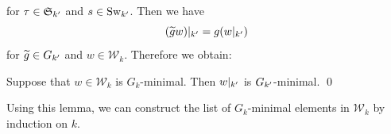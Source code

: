 \documentclass{amsart} %
\newcommand{\Sw}{\mathrm{Sw}}
\newcommand{\Wk}{\mathcal{W}_k}
\begin{document}
for $\tau\in \mathord{\mathfrak{S}}_{k^{\prime}}$ and $s \in\Sw_{k\sprime}$.
Then we have
\[
(\widetilde{g} w)|_{k^{\prime}}=g(w|_{k^{\prime}})
\]
for $\widetilde{g}\in G_{k^{\prime}}$ and $w\in \Wk$.
Therefore we obtain:
%
\begin{lemma}
Suppose that $w \in \Wk$ is $G_k$-minimal.
Then $w|_{k^{\prime}}$ is $G_{k^{\prime}}$-minimal.
\qed
\end{lemma}
%
%
Using this lemma, we can construct the list of $G_k$-minimal elements
in $\Wk$ 
by induction on $k$.
%
\end{document}
